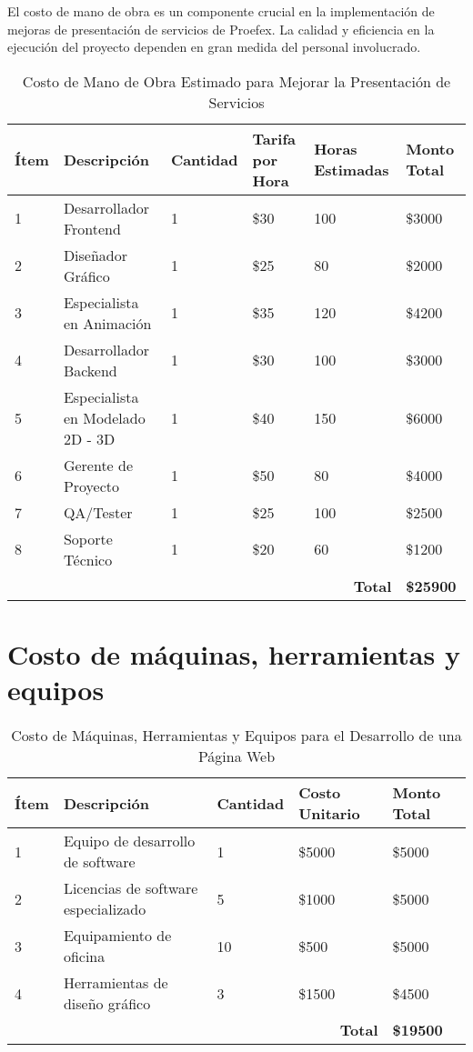 El costo de mano de obra es un componente crucial en la implementación de mejoras de 
presentación de servicios de Proefex. La calidad y eficiencia en la ejecución del proyecto 
dependen en gran medida del personal involucrado. 

\begin{table}[htbp]
    \centering
    \begin{tabular}{|p{1cm}|p{2.5cm}|p{1.5cm}|p{1.5cm}|p{1.5cm}|p{1.5cm}|}
    \hline
    \textbf{Ítem} & \textbf{Descripción} & \textbf{Cantidad} & \textbf{Tarifa por Hora} & \textbf{Horas Estimadas} & \textbf{Monto Total} \\
    \hline
    1 & Desarrollador Frontend & 1 & \$30 & 100 & \$3000 \\
    \hline
    2 & Diseñador Gráfico & 1 & \$25 & 80 & \$2000 \\
    \hline
    3 & Especialista en Animación & 1 & \$35 & 120 & \$4200 \\
    \hline
    4 & Desarrollador Backend & 1 & \$30 & 100 & \$3000 \\
    \hline
    5 & Especialista en Modelado 2D - 3D & 1 & \$40 & 150 & \$6000 \\
    \hline
    6 & Gerente de Proyecto & 1 & \$50 & 80 & \$4000 \\
    \hline
    7 & QA/Tester & 1 & \$25 & 100 & \$2500 \\
    \hline
    8 & Soporte Técnico & 1 & \$20 & 60 & \$1200 \\
    \hline
    \multicolumn{5}{|r|}{\textbf{Total}} & \textbf{\$25900} \\
    \hline
    \end{tabular}
    \caption{Costo de Mano de Obra Estimado para Mejorar la Presentación de Servicios}
    \label{tab:costo_mano_de_obra}
\end{table}

\section{Costo de máquinas, herramientas y equipos}

\begin{table}[!ht]
    \centering
    \begin{tabular}{|p{3cm}|p{4cm}|p{2cm}|p{2cm}|p{2cm}|}
    \hline
    \textbf{Ítem} & \textbf{Descripción} & \textbf{Cantidad} & \textbf{Costo Unitario} & \textbf{Monto Total} \\
    \hline
    1 & Equipo de desarrollo de software & 1 & \$5000 & \$5000 \\
    \hline
    2 & Licencias de software especializado & 5 & \$1000 & \$5000 \\
    \hline
    3 & Equipamiento de oficina & 10 & \$500 & \$5000 \\
    \hline
    4 & Herramientas de diseño gráfico & 3 & \$1500 & \$4500 \\
    \hline
    \multicolumn{4}{|r|}{\textbf{Total}} & \textbf{\$19500} \\
    \hline
    \end{tabular}
    \caption{Costo de Máquinas, Herramientas y Equipos para el Desarrollo de una Página Web}
    \label{tab:costo_maquinas}
\end{table}


